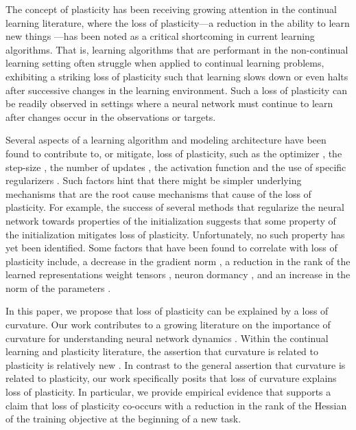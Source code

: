 \documentclass{article}
\begin{document}
The concept of plasticity has been receiving growing attention in the continual learning literature, where the loss of plasticity---a reduction in the ability to learn new things \citep{dohare23_maint_plast_deep_contin_learn,lyle23_under}---has been noted as a critical shortcoming in current learning algorithms.
That is, learning algorithms that are performant in the non-continual learning setting often struggle when applied to continual learning problems, exhibiting a striking loss of plasticity such that  learning  slows down or even halts after successive changes in the learning environment.
Such a loss of plasticity can be readily observed in settings where a neural network must continue to learn after changes  occur in the observations or targets.

Several aspects of a learning algorithm and modeling architecture have been found to contribute to, or mitigate, loss of plasticity, such as the optimizer \citep{dohare23_maint_plast_deep_contin_learn}, the step-size \citep{ash20_warm_start_neural_networ_train,berariu2021study}, the number of updates \citep{lyle23_under}, the activation function \citep{abbas23_loss_plast_contin_deep_reinf_learn} and the use of specific regularizers \citep{dohare21_contin_backp,kumar23_maint_plast_regen_regul,lyle21_under_preven_capac_loss_reinf_learn}.
Such factors hint that there might be simpler underlying mechanisms that are the root cause mechanisms that cause
of the loss of plasticity.
For example, the success of several methods that regularize the neural network towards properties of the initialization suggests that some property of the initialization mitigates loss of plasticity.
Unfortunately, no such property has yet been identified.
Some factors that have been found to correlate with loss of plasticity include, a decrease in the gradient norm \citep{abbas23_loss_plast_contin_deep_reinf_learn}, a reduction in the rank of the learned representations weight tensors \citep{kumar20_implic_under_param_inhib_data,gulcehre22_rl}, neuron dormancy \citep{sokar23_dorman_neuron_phenom_deep_reinf_learn}, and an increase in the norm of the parameters \citep{nikishin22_primac_bias_deep_reinf_learn}.


In this paper, we propose that loss of plasticity can be explained by a loss of curvature.
Our work contributes to a growing literature on the importance of curvature for understanding neural network dynamics \citep{cohen2021gradient,hochreiter97_flat,fort19_emerg}.
Within the continual learning and plasticity literature, the assertion that curvature is related to plasticity is relatively new \citep{lyle23_under}.
In contrast to the general assertion that curvature is related to plasticity, our work specifically posits that loss of curvature explains loss of plasticity.
In particular, we provide empirical evidence that supports a claim that
loss of plasticity co-occurs with a reduction in the rank of the Hessian of the training objective at the beginning of a new task.
\end{document}
